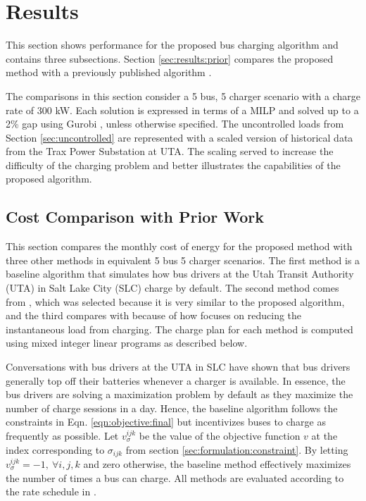 \section{Results\label{sec:results}}
This section shows performance for the proposed bus charging algorithm and contains three subsections. Section \ref{sec:results:prior} compares the proposed method with a previously published algorithm \cite{He_2022_Battery}. 
\par The comparisons in this section consider a 5 bus, 5 charger scenario with a charge rate of 300 kW. Each solution is expressed in terms of a MILP and solved up to a 2\% gap using Gurobi \cite{gurobi}, unless otherwise specified. The uncontrolled loads from Section \ref{sec:uncontrolled} are represented with a scaled version of historical data from the Trax Power Substation at UTA. The scaling served to increase the difficulty of the charging problem and better illustrates the capabilities of the proposed algorithm. 

\subsection{Cost Comparison with Prior Work\label{sec:results:prior}} 
This section compares the monthly cost of energy for the proposed method with three other methods in equivalent 5 bus 5 charger scenarios. The first method is a baseline algorithm that simulates how bus drivers at the Utah Transit Authority (UTA) in Salt Lake City (SLC) charge by default. The second method comes from \cite{He_2019_Fast}, which was selected because it is very similar to the proposed algorithm, and the third compares with \cite{ojer_development_2020} because of how \cite{ojer_development_2020} focuses on reducing the instantaneous load from charging. The charge plan for each method is computed using mixed integer linear programs as described below.  
\par Conversations with bus drivers at the UTA in SLC have shown that bus drivers generally top off their batteries whenever a charger is available. In essence, the bus drivers are solving a maximization problem by default as they maximize the number of charge sessions in a day. Hence, the baseline algorithm follows the constraints in Eqn. \eqref{eqn:objective:final} but incentivizes buses to charge as frequently as possible. Let $v_{\sigma}^{ijk}$ be the value of the objective function $v$ at the index corresponding to $\sigma_{ijk}$ from section \ref{sec:formulation:constraint}. By letting $v^{ijk}_{\sigma} = -1, \ \forall i,j,k$ and zero otherwise, the baseline method effectively maximizes the number of times a bus can charge.  
 All methods are evaluated according to the rate schedule in \cite{rocky_mountain_power_rocky_2021}. 


